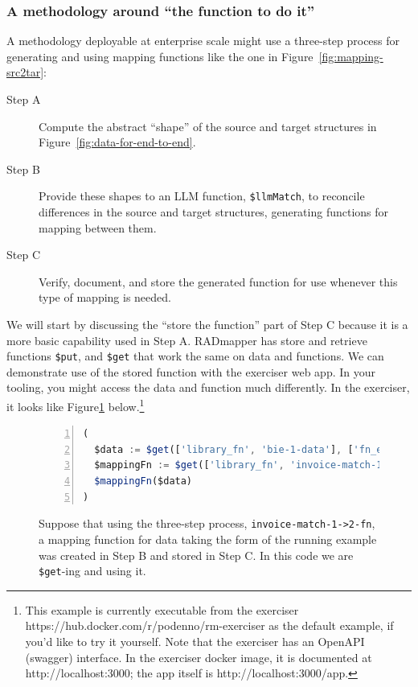 \documentclass[10pt,letterpaper]{article} %
\newcommand{\stt}[1]{\texttt{#1}} %
\begin{document}
\subsubsection{A methodology around ``the function to do it''}

A methodology deployable at enterprise scale might use a three-step process for generating and using
mapping functions like the one in Figure~\ref{fig:mapping-src2tar}:
\begin{description}
  \item[Step A] Compute the abstract ``shape'' of the source and target structures in Figure~\ref{fig:data-for-end-to-end}.
  \item[Step B] Provide these shapes to an LLM function, \stt{\$llmMatch}, to reconcile differences in the source and target structures, generating functions for mapping between them.
\item[Step C] Verify, document, and store the generated function for use whenever this type of mapping is needed.
\end{description}

We will start by discussing the ``store the function'' part of Step C because it is a more basic capability used in Step A.
RADmapper has store and retrieve functions \stt{\$put}, and \stt{\$get} that work the same on data and functions.
We can demonstrate use of the stored function with the exerciser web app.
In your tooling, you might access the data and function much differently.
In the exerciser, it looks like Figure\ref{fig:run-a-map-fn} below.\footnote{This example is currently executable from the exerciser https://hub.docker.com/r/podenno/rm-exerciser as the default example, if you'd like to try it yourself.
  Note that the exerciser has an OpenAPI (swagger) interface.
  In the exerciser docker image, it is documented at http://localhost:3000; the app itself is http://localhost:3000/app.}

\begin{figure}[H]
  \caption{Suppose that using the three-step process, \stt{invoice-match-1->2-fn}, a mapping function for data taking the form of the running example was created in Step B and stored in Step C.
    In this code we are \stt{\$get}-ing and using it.}
  \label{fig:run-a-map-fn}
\begin{lstlisting}[language=JavaScript,numberstyle=\scriptsize,basicstyle=\ttfamily\scriptsize,numbers=left,stepnumber=1,breaklines=true]
(
  $data := $get(['library_fn', 'bie-1-data'], ['fn_exe']).fn_exe;
  $mappingFn := $get(['library_fn', 'invoice-match-1->2-fn'], ['fn_exe']).fn_exe;
  $mappingFn($data)
)
\end{lstlisting} \vspace{-2em}
\end{figure}
\end{document}
